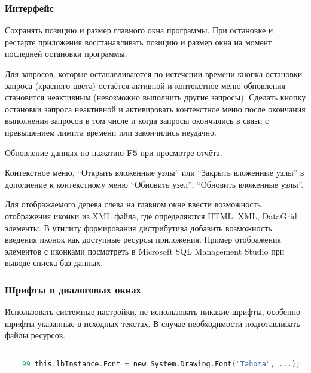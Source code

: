 \subsubsection{Интерфейс}

Сохранять позицию и размер главного окна программы. При остановке и рестарте приложения
восстанавливать позицию и размер окна на момент последней остановки программы.

\bigskip

Для запросов, которые останавливаются по истечении времени кнопка остановки запроса (красного цвета)
остаётся активной и контекстное меню обновления становится неактивным (невозможно выполнить другие
запросы). Сделать кнопку остановки запроса неактивной и активировать контекстное меню после
окончания выполнения запросов в том числе и когда запросы окончились в связи с превышением лимита
времени или закончились неудачно.

\bigskip

Обновление данных по нажатию \textbf{F5} при просмотре отчёта.

\bigskip

Контекстное меню, ``Открыть вложенные узлы'' или ``Закрыть вложенные узлы'' в дополнение к
контекстному меню ``Обновить узел'', ``Обновить вложенные узлы''.

\bigskip

Для отображаемого дерева слева на главном окне ввести возможность отображения иконки из XML файла,
где определяются HTML, XML, DataGrid элементы. В утилиту формирования дистрибутива добавить
возможность введения иконок как доступные ресурсы приложения. Пример отображения элементов с
иконками посмотреть в Micro\-soft SQL Mana\-gement Studio при выводе списка баз данных.

\subsubsection{Шрифты в диалоговых окнах}

Использовать системные настройки, не использовать никакие шрифты, особенно шрифты указанные в
исходных текстах. В случае необходимости подготавливать файлы ресурсов.

\begin{lstlisting}[language=C,label=Fonts:frmErrorLog.Designer.cs,caption=frmErrorLog.Designer.cs]

	99 this.lbInstance.Font = new System.Drawing.Font("Tahoma", ...);

\end{lstlisting}

